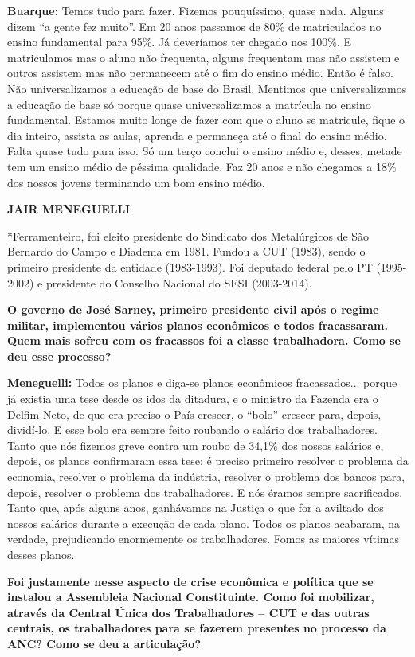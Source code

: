\textbf{Buarque:} Temos tudo para fazer. Fizemos pouquíssimo, quase
nada. Alguns dizem ``a gente fez muito''. Em 20 anos passamos de 80\% de
matriculados no ensino fundamental para 95\%. Já deveríamos ter chegado
nos 100\%. E matriculamos mas o aluno não frequenta, alguns frequentam
mas não assistem e outros assistem mas não permanecem até o fim do
ensino médio. Então é falso. Não universalizamos a educação de base do
Brasil. Mentimos que universalizamos a educação de base só porque quase
universalizamos a matrícula no ensino fundamental. Estamos muito longe
de fazer com que o aluno se matricule, fique o dia inteiro, assista as
aulas, aprenda e permaneça até o final do ensino médio. Falta quase tudo
para isso. Só um terço conclui o ensino médio e, desses, metade tem um
ensino médio de péssima qualidade. Faz 20 anos e não chegamos a 18\% dos
nossos jovens terminando um bom ensino médio.

\textbf{JAIR MENEGUELLI}

*Ferramenteiro, foi eleito presidente do Sindicato dos Metalúrgicos de
São Bernardo do Campo e Diadema em 1981. Fundou a CUT (1983), sendo o
primeiro presidente da entidade (1983-1993). Foi deputado federal pelo
PT (1995-2002) e presidente do Conselho Nacional do SESI (2003-2014).

\textbf{O governo de José Sarney, primeiro presidente civil após o
regime militar, implementou vários planos econômicos e todos
fracassaram. Quem mais sofreu com os fracassos foi a classe
trabalhadora. Como se deu esse processo?}

\textbf{Meneguelli:} Todos os planos e diga-se planos econômicos
fracassados... porque já existia uma tese desde os idos da ditadura, e o
ministro da Fazenda era o Delfim Neto, de que era preciso o País
crescer, o ``bolo'' crescer para, depois, dividí-lo. E esse bolo era
sempre feito roubando o salário dos trabalhadores. Tanto que nós fizemos
greve contra um roubo de 34,1\% dos nossos salários e, depois, os planos
confirmaram essa tese: é preciso primeiro resolver o problema da
economia, resolver o problema da indústria, resolver o problema dos
bancos para, depois, resolver o problema dos trabalhadores. E nós éramos
sempre sacrificados. Tanto que, após alguns anos, ganhávamos na Justiça
o que for a aviltado dos nossos salários durante a execução de cada
plano. Todos os planos acabaram, na verdade, prejudicando enormemente os
trabalhadores. Fomos as maiores vítimas desses planos.

\textbf{Foi justamente nesse aspecto de crise econômica e política que
se instalou a Assembleia Nacional Constituinte. Como foi mobilizar,
através da Central Única dos Trabalhadores -- CUT e das outras centrais,
os trabalhadores para se fazerem presentes no processo da ANC? Como se
deu a articulação?}


